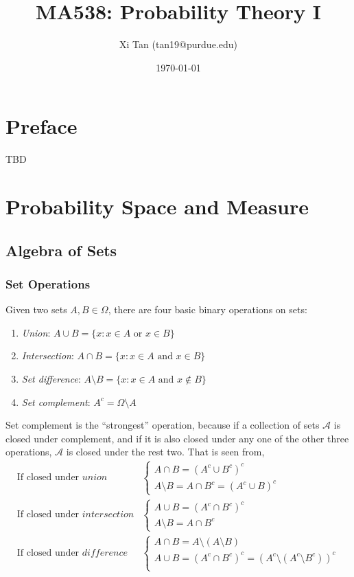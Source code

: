 \documentclass{article}
\title{MA538: Probability Theory I}
\author{Xi Tan (tan19@purdue.edu)}
\date{\today}
\newcommand{\mA}{\mathscr{A}}
\begin{document}
\maketitle
\tableofcontents
\newpage

\section*{Preface}
TBD

\newpage
\section{Probability Space and Measure}
\subsection{Algebra of Sets}

\subsubsection{Set Operations}
Given two sets $A, B \in \Omega$, there are four basic binary operations on sets:
\begin{enumerate}
	\item {\em{Union}}: $A \cup B = \{x: x \in A \mbox{ or } x \in B\}$
	\item {\em{Intersection}}: $A \cap B = \{x: x \in A \mbox{ and } x \in B\}$
	\item {\em{Set difference}}: $A \setminus B = \{x: x \in A \mbox{ and } x \notin B\}$
	\item {\em{Set complement}}: $A^c = \Omega \setminus A$
\end{enumerate}

Set complement is the ``strongest'' operation, because if a collection of sets $\mA$ is closed under complement, and if it is also closed under any one of the other three operations, $\mA$ is closed under the rest two. That is seen from,
\begin{align}
	\mbox{If closed under } union &
	\begin{cases}
		A \cap B = (A^c \cup B^c)^c\\
		A \setminus B = A \cap B^c = (A^c \cup B)^c
	\end{cases}	
	\\
	\mbox{If closed under } intersection &
	\begin{cases}
		A \cup B = (A^c \cap B^c)^c\\		
		A \setminus B = A \cap B^c
	\end{cases}
	\\
	\mbox{If closed under } difference &
	\begin{cases}
		A \cap B = A \setminus (A \setminus B)\\
		A \cup B = (A^c \cap B^c)^c = (A^c \setminus (A^c \setminus B^c))^c\\
	\end{cases}		
\end{align}
\end{document}
